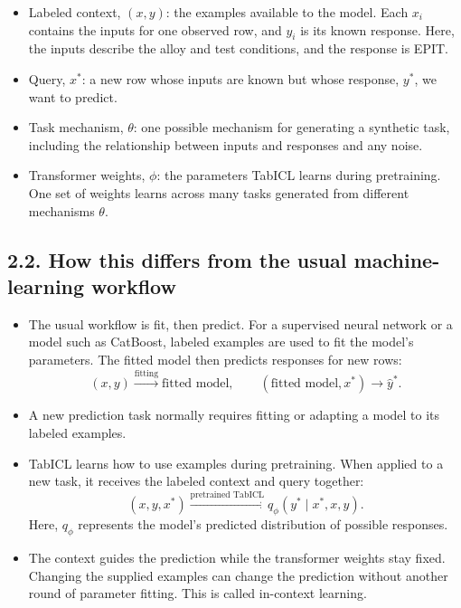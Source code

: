 \documentclass[11pt]{article}
\newenvironment{notes}
  {\begin{itemize}\setlength{\itemsep}{0.45em}\setlength{\parsep}{0pt}}
  {\end{itemize}}
\begin{document}
\begin{notes}

    \item Labeled context, \((x,y)\): the examples available to the model. Each \(x_i\)
    contains the inputs for one observed row, and \(y_i\) is its known response. Here, the
    inputs describe the alloy and test conditions, and the response is EPIT.

    \item Query, \(x^\ast\): a new row whose inputs are known but whose response,
    \(y^\ast\), we want to predict.

    \item Task mechanism, \(\theta\): one possible mechanism for generating a synthetic
    task, including the relationship between inputs and responses and any noise.

    \item Transformer weights, \(\phi\): the parameters TabICL learns during pretraining.
    One set of weights learns across many tasks generated from different mechanisms
    \(\theta\).

\end{notes}

\subsection*{2.2. How this differs from the usual machine-learning workflow}

\begin{notes}

    \item The usual workflow is fit, then predict. For a supervised neural network or a
    model such as CatBoost, labeled examples are used to fit the model’s parameters. The
    fitted model then predicts responses for new rows:
    \[
    (x,y)\xrightarrow{\text{fitting}}\text{fitted model}, \qquad (\text{fitted
    model},x^\ast)\longrightarrow\widehat y^\ast.
    \]

    \item A new prediction task normally requires fitting or adapting a model to its labeled
    examples.

    \item TabICL learns how to use examples during pretraining. When applied to a new task,
    it receives the labeled context and query together:
    \[
    (x,y,x^\ast) \xrightarrow{\text{pretrained TabICL}} q_\phi(y^\ast\mid x^\ast,x,y).
    \]
    Here, \(q_\phi\) represents the model’s predicted distribution of possible responses.

    \item The context guides the prediction while the transformer weights stay fixed.
    Changing the supplied examples can change the prediction without another round of
    parameter fitting. This is called in-context learning.

\end{notes}
\end{document}
